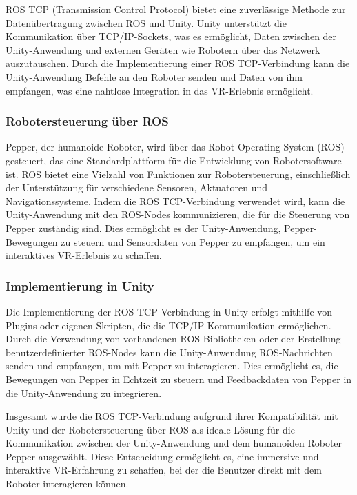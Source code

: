 ROS TCP (Transmission Control Protocol) bietet eine zuverlässige Methode zur Datenübertragung zwischen ROS und Unity. Unity unterstützt die Kommunikation über TCP/IP-Sockets, was es ermöglicht, Daten zwischen der Unity-Anwendung und externen Geräten wie Robotern über das Netzwerk auszutauschen. Durch die Implementierung einer ROS TCP-Verbindung kann die Unity-Anwendung Befehle an den Roboter senden und Daten von ihm empfangen, was eine nahtlose Integration in das VR-Erlebnis ermöglicht.

\subsubsection{Robotersteuerung über ROS}

Pepper, der humanoide Roboter, wird über das Robot Operating System (ROS) gesteuert, das eine Standardplattform für die Entwicklung von Robotersoftware ist. ROS bietet eine Vielzahl von Funktionen zur Robotersteuerung, einschließlich der Unterstützung für verschiedene Sensoren, Aktuatoren und Navigationssysteme. Indem die ROS TCP-Verbindung verwendet wird, kann die Unity-Anwendung mit den ROS-Nodes kommunizieren, die für die Steuerung von Pepper zuständig sind. Dies ermöglicht es der Unity-Anwendung, Pepper-Bewegungen zu steuern und Sensordaten von Pepper zu empfangen, um ein interaktives VR-Erlebnis zu schaffen.

\subsubsection{Implementierung in Unity}

Die Implementierung der ROS TCP-Verbindung in Unity erfolgt mithilfe von Plugins oder eigenen Skripten, die die TCP/IP-Kommunikation ermöglichen. Durch die Verwendung von vorhandenen ROS-Bibliotheken oder der Erstellung benutzerdefinierter ROS-Nodes kann die Unity-Anwendung ROS-Nachrichten senden und empfangen, um mit Pepper zu interagieren. Dies ermöglicht es, die Bewegungen von Pepper in Echtzeit zu steuern und Feedbackdaten von Pepper in die Unity-Anwendung zu integrieren.

Insgesamt wurde die ROS TCP-Verbindung aufgrund ihrer Kompatibilität mit Unity und der Robotersteuerung über ROS als ideale Lösung für die Kommunikation zwischen der Unity-Anwendung und dem humanoiden Roboter Pepper ausgewählt. Diese Entscheidung ermöglicht es, eine immersive und interaktive VR-Erfahrung zu schaffen, bei der die Benutzer direkt mit dem Roboter interagieren können.

